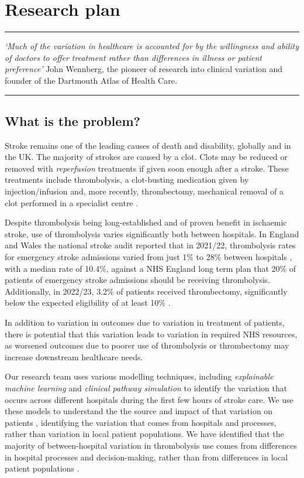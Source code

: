 \section{Research plan}

\vspace{2mm}
\hrule
\textit{`Much of the variation in healthcare is accounted for by the willingness and ability of doctors to offer treatment rather than differences in illness or patient preference'} John Wennberg, the pioneer of research into clinical variation and founder of the Dartmouth Atlas of Health Care.
\vspace{2mm}
\hrule

\subsection{What is the problem?}

Stroke remains one of the leading causes of death and disability, globally and in the UK. The majority of strokes are caused by a clot. Clots may be reduced or removed with \textit{reperfusion} treatments if given soon enough after a stroke. These treatments include thrombolysis, a clot-busting medication given by injection/infusion \cite{emberson_effect_2014} and, more recently, thrombectomy, mechanical removal of a clot performed in a specialist centre \cite{fransen_time_2016}.

Despite thrombolysis being long-established and of proven benefit in ischaemic stroke, use of thrombolysis varies significantly both between hospitals. In England and Wales the national stroke audit reported that in 2021/22, thrombolysis rates for emergency stroke admissions varied from just 1\% to 28\% between hospitals \cite{sentinel_national_stroke_audit_programme_ssnap_2022}, with a median rate of 10.4\%, against a NHS England long term plan that 20\% of patients of emergency stroke admissions should be receiving thrombolysis. Additionally, in 2022/23, 3.2\% of patients received thrombectomy, significantly below the expected eligibility of at least 10\% \cite{mcmeekin_updating_2021}. 

In addition to variation in outcomes due to variation in treatment of patients, there is potential that this variation leads to variation in required NHS resources, as worsened outcomes due to poorer use of thrombolysis or thrombectomy may increase downstream healthcare needs.

Our research team uses various modelling techniques, including \textit{explainable machine learning} and \textit{clinical pathway simulation} to identify the variation that occurs across different hospitals during the first few hours of stroke care. We use these models to understand the the source and impact of that variation on patients \cite{allen_using_2022, allen_use_2022}, identifying the variation that comes from hospitals and processes, rather than variation in local patient populations. We have identified that the majority of between-hospital variation in thrombolysis use comes from differences in hospital processes and decision-making, rather than from differences in local patient populations \cite{allen_using_2022, allen_use_2022}.

